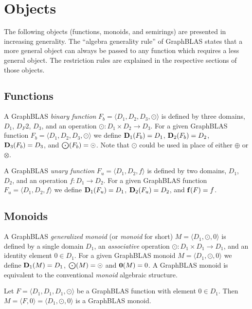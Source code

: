 \section{Objects}

The following objects (functions, monoids, and semirings) are presented in increasing generality.
The ``algebra generality rule'' of GraphBLAS states that a more general object can always be passed to
any function which requires a less general object. The restriction rules are explained in the respective sections of those objects.

\subsection{Functions}

A GraphBLAS \emph{binary function} $F_b = \langle D_1, D_2, D_3, \odot \rangle$
is defined by three domains, $D_1$, $D_F2$, $D_3$, and an operation
$\odot: D_1 \times D_2 \rightarrow D_3$.  For a given GraphBLAS function
$F_b=\langle D_1, D_2, D_3,\odot \rangle$ we define $\bold{D}_1(F_b) = D_1$,
$\bold{D}_2(F_b) = D_2$, $\bold{D}_3(F_b) = D_3$, and $\bold{\bigodot}(F_b)
= \odot$.  Note that $\odot$ could be used in place of either $\oplus$ or $\otimes$.

A GraphBLAS \emph{unary function} $F_u = \langle D_1, D_2, f\rangle$
is defined by two domains, $D_1$, $D_2$, and an operation
$f: D_1 \rightarrow D_2$.  For a given GraphBLAS function
$F_u=\langle D_1, D_2, f \rangle$ we define $\bold{D}_1(F_u) = D_1$,
$\bold{D}_2(F_u) = D_2$, and $\bold{f}(F)
= f$.

\subsection{Monoids}

A GraphBLAS \emph{generalized monoid} (or \emph{monoid} for short) $M =
\langle D_1,\odot,0 \rangle$ is defined by a single domain $D_1$, an 
\emph{associative} operation $\odot: D_1 \times D_1 \rightarrow D_1$,
and an identity element $0 \in D_1$.  For a given GraphBLAS monoid $M=\langle
D_1,\odot,0 \rangle$ we define $\bold{D}_1(M) = D_1$, $\bold{\bigodot}(M) =
\odot$ and $\bold{0}(M) = 0$.  A GraphBLAS monoid is equivalent to 
the conventional \emph{monoid} algebraic structure.

Let $F = \langle D_1,D_1,D_1,\odot \rangle$ be a GraphBLAS function
with element $0 \in D_1$.  Then $M = \langle F,0 \rangle = \langle
D_1,\odot,0 \rangle$ is a GraphBLAS monoid.

